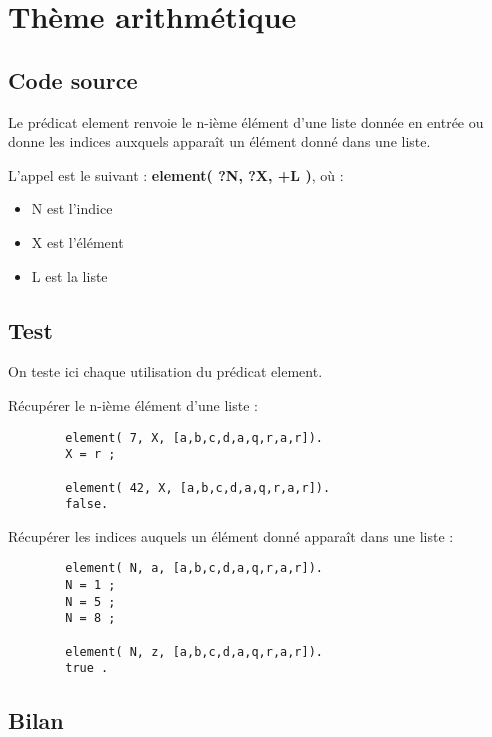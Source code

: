 
\section{Thème arithmétique}

    \subsection{Code source}

        

	Le prédicat element renvoie le n-ième élément d'une liste donnée en
	entrée ou donne les indices auxquels apparaît un élément donné dans
	une liste.

	L'appel est le suivant : \textbf{element( ?N, ?X, +L )}, où :
	\begin {itemize}
	    \item N est l'indice
	    \item X est l'élément
	    \item L est la liste
	\end {itemize}

    \subsection{Test}
	On teste ici chaque utilisation du prédicat element.

	Récupérer le n-ième élément d'une liste :

	\begin {lstlisting}
	    element( 7, X, [a,b,c,d,a,q,r,a,r]).
	    X = r ;
	    
	    element( 42, X, [a,b,c,d,a,q,r,a,r]).
	    false.
	\end {lstlisting}

	Récupérer les indices auquels un élément donné apparaît dans une liste
	:

	\begin {lstlisting}
	    element( N, a, [a,b,c,d,a,q,r,a,r]).
	    N = 1 ;
	    N = 5 ;
	    N = 8 ;
	    
	    element( N, z, [a,b,c,d,a,q,r,a,r]).
	    true .
	\end {lstlisting}

    \subsection{Bilan}
